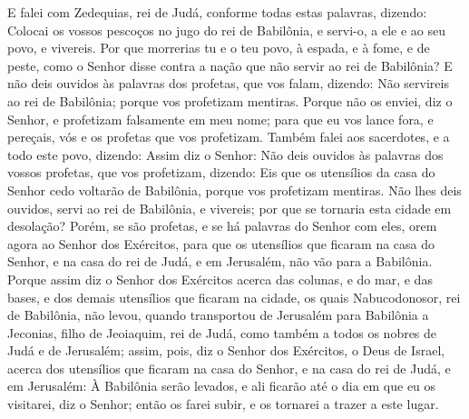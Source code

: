 E falei com Zedequias, rei de Judá, conforme todas estas
palavras, dizendo: Colocai os vossos pescoços no jugo do rei de
Babilônia, e servi-o, a ele e ao seu povo, e vivereis. Por
que morrerias tu e o teu povo, à espada, e à fome, e de peste, como
o Senhor disse contra a nação que não servir ao rei de Babilônia?
E não deis ouvidos às palavras dos profetas, que vos falam,
dizendo: Não servireis ao rei de Babilônia; porque vos profetizam
mentiras. Porque não os enviei, diz o Senhor, e profetizam
falsamente em meu nome; para que eu vos lance fora, e pereçais, vós
e os profetas que vos profetizam. Também falei aos
sacerdotes, e a todo este povo, dizendo: Assim diz o Senhor: Não
deis ouvidos às palavras dos vossos profetas, que vos profetizam,
dizendo: Eis que os utensílios da casa do Senhor cedo voltarão de
Babilônia, porque vos profetizam mentiras. Não lhes deis
ouvidos, servi ao rei de Babilônia, e vivereis; por que se tornaria
esta cidade em desolação? Porém, se são profetas, e se há
palavras do Senhor com eles, orem agora ao Senhor dos Exércitos,
para que os utensílios que ficaram na casa do Senhor, e na casa do
rei de Judá, e em Jerusalém, não vão para a Babilônia. Porque
assim diz o Senhor dos Exércitos acerca das colunas, e do mar, e das
bases, e dos demais utensílios que ficaram na cidade, os
quais Nabucodonosor, rei de Babilônia, não levou, quando transportou
de Jerusalém para Babilônia a Jeconias, filho de Jeoiaquim, rei de
Judá, como também a todos os nobres de Judá e de Jerusalém;
assim, pois, diz o Senhor dos Exércitos, o Deus de Israel,
acerca dos utensílios que ficaram na casa do Senhor, e na casa do
rei de Judá, e em Jerusalém: À Babilônia serão levados, e ali
ficarão até o dia em que eu os visitarei, diz o Senhor; então os
farei subir, e os tornarei a trazer a este lugar.

\medskip

